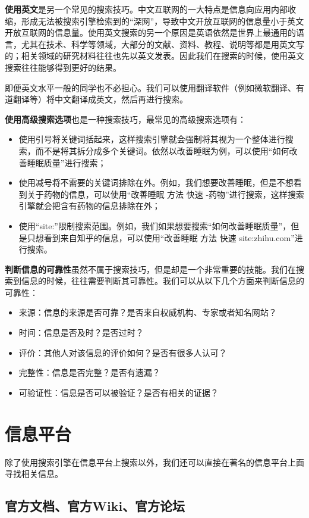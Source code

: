 \documentclass[../main.tex]{subfiles}
\begin{document}
\textbf{使用英文}是另一个常见的搜索技巧。中文互联网的一大特点是信息向应用内部收缩，形成无法被搜索引擎检索到的“深网”，导致中文开放互联网的信息量小于英文开放互联网的信息量。使用英文搜索的另一个原因是英语依然是世界上最通用的语言，尤其在技术、科学等领域，大部分的文献、资料、教程、说明等都是用英文写的；相关领域的研究材料往往也先以英文发表。因此我们在搜索的时候，使用英文搜索往往能够得到更好的结果。

即便英文水平一般的同学也不必担心。我们可以使用翻译软件（例如微软翻译、有道翻译等）将中文翻译成英文，然后再进行搜索。

\textbf{使用高级搜索选项}也是一种搜索技巧，最常见的高级搜索选项有：
\begin{itemize}
    \item 使用引号将关键词括起来，这样搜索引擎就会强制将其视为一个整体进行搜索，而不是将其拆分成多个关键词。依然以改善睡眠为例，可以使用“如何改善睡眠质量”进行搜索；
    \item 使用减号将不需要的关键词排除在外。例如，我们想要改善睡眠，但是不想看到关于药物的信息，可以使用“改善睡眠 方法 快速 -药物”进行搜索，这样搜索引擎就会把含有药物的信息排除在外；
    \item 使用“site:”限制搜索范围。例如，我们如果想要搜索“如何改善睡眠质量”，但是只想看到来自知乎的信息，可以使用“改善睡眠 方法 快速 site:zhihu.com”进行搜索。
\end{itemize}

\textbf{判断信息的可靠性}虽然不属于搜索技巧，但是却是一个非常重要的技能。我们在搜索到信息的时候，往往需要判断其可靠性。我们可以从以下几个方面来判断信息的可靠性：
\begin{itemize}
    \item 来源：信息的来源是否可靠？是否来自权威机构、专家或者知名网站？
    \item 时间：信息是否及时？是否过时？
    \item 评价：其他人对该信息的评价如何？是否有很多人认可？
    \item 完整性：信息是否完整？是否有遗漏？
    \item 可验证性：信息是否可以被验证？是否有相关的证据？
\end{itemize}

\section{信息平台}

除了使用搜索引擎在信息平台上搜索以外，我们还可以直接在著名的信息平台上面寻找相关信息。

\subsection{官方文档、官方Wiki、官方论坛}
\end{document}
